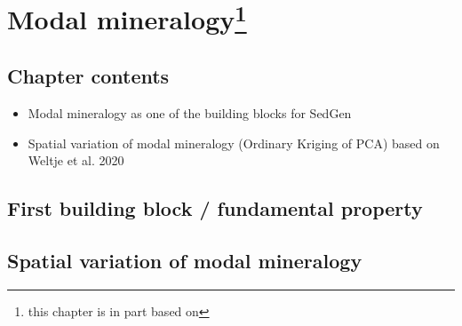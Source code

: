\chapter[Modal mineralogy]{Modal mineralogy\footnote{this chapter is in part based on }}\label{ch:modal_mineralogy}

\section{Chapter contents}
\begin{itemize}
    \item Modal mineralogy as one of the building blocks for SedGen
    \item Spatial variation of modal mineralogy (Ordinary Kriging of PCA) based on Weltje et al. 2020
\end{itemize}

\section{First building block / fundamental property}

\section{Spatial variation of modal mineralogy}





\cleardoublepage

